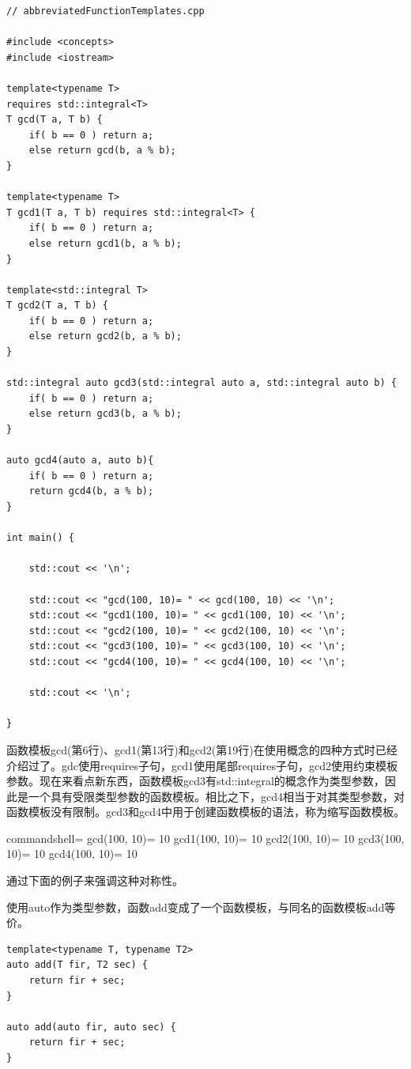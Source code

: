 \begin{lstlisting}[style=styleCXX]
// abbreviatedFunctionTemplates.cpp

#include <concepts>
#include <iostream>

template<typename T>
requires std::integral<T>
T gcd(T a, T b) {
	if( b == 0 ) return a;
	else return gcd(b, a % b);
}

template<typename T>
T gcd1(T a, T b) requires std::integral<T> {
	if( b == 0 ) return a;
	else return gcd1(b, a % b);
}

template<std::integral T>
T gcd2(T a, T b) {
	if( b == 0 ) return a;
	else return gcd2(b, a % b);
}

std::integral auto gcd3(std::integral auto a, std::integral auto b) {
	if( b == 0 ) return a;
	else return gcd3(b, a % b);
}

auto gcd4(auto a, auto b){
	if( b == 0 ) return a;
	return gcd4(b, a % b);
}

int main() {

	std::cout << '\n';

	std::cout << "gcd(100, 10)= " << gcd(100, 10) << '\n';
	std::cout << "gcd1(100, 10)= " << gcd1(100, 10) << '\n';
	std::cout << "gcd2(100, 10)= " << gcd2(100, 10) << '\n';
	std::cout << "gcd3(100, 10)= " << gcd3(100, 10) << '\n';
	std::cout << "gcd4(100, 10)= " << gcd4(100, 10) << '\n';

	std::cout << '\n';

}
\end{lstlisting}

函数模板gcd(第6行)、gcd1(第13行)和gcd2(第19行)在使用概念的四种方式时已经介绍过了。gdc使用requires子句，gcd1使用尾部requires子句，gcd2使用约束模板参数。现在来看点新东西，函数模板gcd3有std::integral的概念作为类型参数，因此是一个具有受限类型参数的函数模板。相比之下，gcd4相当于对其类型参数，对函数模板没有限制。gcd3和gcd4中用于创建函数模板的语法，称为缩写函数模板。

\begin{tcblisting}{commandshell={}}
gcd(100, 10)= 10
gcd1(100, 10)= 10
gcd2(100, 10)= 10
gcd3(100, 10)= 10
gcd4(100, 10)= 10
\end{tcblisting}

通过下面的例子来强调这种对称性。

使用auto作为类型参数，函数add变成了一个函数模板，与同名的函数模板add等价。

\begin{lstlisting}[style=styleCXX]
template<typename T, typename T2>
auto add(T fir, T2 sec) {
	return fir + sec;
}

auto add(auto fir, auto sec) {
	return fir + sec;
}
\end{lstlisting}

